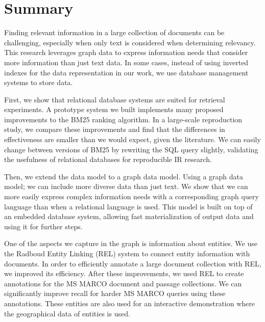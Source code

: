 \chapter*{Summary}

Finding relevant information in a large collection of documents can be challenging, especially when only text is considered when determining relevancy. This research leverages graph data to express information needs that consider more information than just text data. In some cases, instead of using inverted indexes for the data representation in our work, we use database management systems to store data.

First, we show that relational database systems are suited for retrieval experiments. A prototype system we built implements many proposed improvements to the BM25 ranking algorithm. In a large-scale reproduction study, we compare these improvements and find that the differences in effectiveness are smaller than we would expect, given the literature. We can easily change between versions of BM25 by rewriting the SQL query slightly, validating the usefulness of relational databases for reproducible IR research. 

Then, we extend the data model to a graph data model. Using a graph data model; we can include more diverse data than just text. We show that we can more easily express complex information needs with a corresponding graph query language than when a relational language is used. This model is built on top of an embedded database system, allowing fast materialization of output data and using it for further steps.

One of the aspects we capture in the graph is information about entities. We use the Radboud Entity Linking (REL) system to connect entity information with documents. In order to efficiently annotate a large document collection with REL, we improved its efficiency. After these improvements, we used REL to create annotations for the MS MARCO document and passage collections. We can significantly improve recall for harder MS MARCO queries using these annotations. These entities are also used for an interactive demonstration where the geographical data of entities is used.


